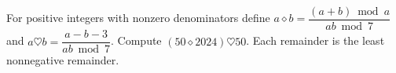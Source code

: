 For positive integers with nonzero denominators define $a\diamond b=\dfrac{(a+b)\bmod a}{ab\bmod7}$ and $a\heartsuit b=\dfrac{a-b-3}{ab\bmod7}$. Compute $(50\diamond2024)\heartsuit50$. Each remainder is the least nonnegative remainder.
